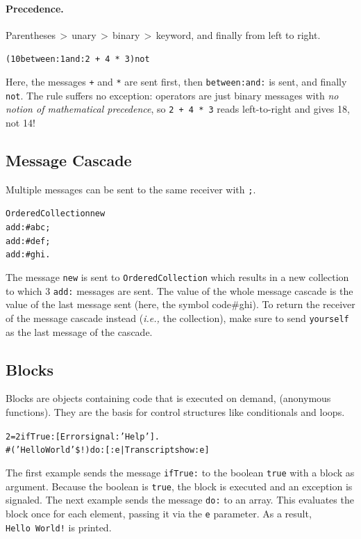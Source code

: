 \documentclass[notumble]{leaflet}
\makeatletter
\newcommand{\ie}{\emph{i.e.,}\xspace}
\newenvironment{displaycode}{%
    \par
    \begin{lrbox}{\code@box}%
        \begin{minipage}{\linewidth}
            \begin{alltt}\small}{
            \end{alltt}
        \end{minipage}
    \end{lrbox}
    \colorbox{light-gray}{\usebox{\code@box}}%
    \par}
\newcommand{\code}[1]{\foreignlanguage{english}{\texttt{#1}}}
\makeatother
\begin{document}
\paragraph{Precedence.}

Parentheses\,$>$\,unary\,$>$\,binary\,$>$\,keyword, and finally from left to right.

\begin{displaycode}
(10 between: 1 and: 2\,+\,4\,*\,3) not
\end{displaycode}

Here, the messages \code{+} and \code{*} are sent first, then \code{between:and:} is sent, and finally \code{not}.
The rule suffers no exception: operators are just binary messages with \emph{no notion of mathematical precedence}, so
\code{2\,+\,4\,*\,3} reads left-to-right and gives 18, not 14!

\subsection{Message Cascade}

Multiple messages can be sent to the same receiver with \code{;}.

\begin{displaycode}
OrderedCollection new
  add: #abc;
  add: #def;
  add: #ghi.
\end{displaycode}

The message \code{new} is sent to \code{OrderedCollection} which
results in a new collection to which 3 \code{add:} messages are sent.
The value of the whole message cascade is the value of the last
message sent (here, the symbol code{\#ghi}). To return the receiver
of the message cascade instead (\ie the collection), make sure to send
\code{yourself} as the last message of the cascade.

\subsection{Blocks}

Blocks are objects containing code that is executed on demand,
(anonymous functions). They are the basis for control structures like
conditionals and loops.

\begin{displaycode}
2 = 2 ifTrue: [Error signal: 'Help'].
\#('Hello World' \$!) do: [:e | Transcript show: e]
\end{displaycode}
The first example sends the message \code{ifTrue:} to the boolean
\code{true} with a block as argument. Because the boolean is
\code{true}, the block is executed and an exception is signaled. The
next example sends the message \code{do:} to an array. This evaluates
the block once for each element, passing it via the \code{e}
parameter. As a result, \code{Hello~World!} is printed.
\end{document}
